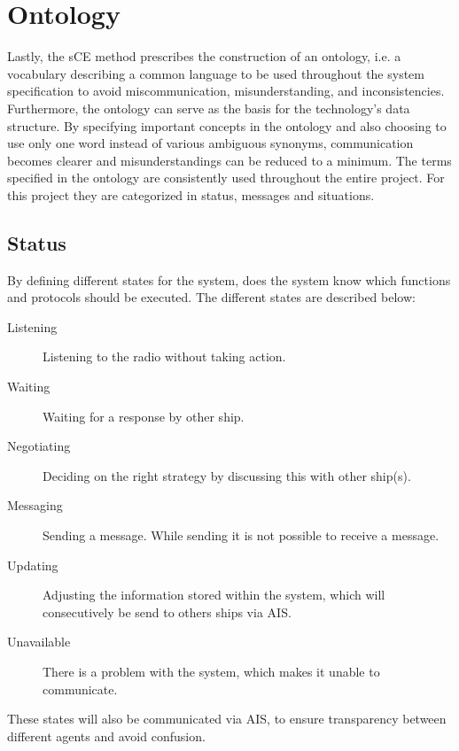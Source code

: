 \section{Ontology}
Lastly, the sCE method prescribes the construction of an ontology, i.e. a vocabulary describing a common language to be used throughout the system specification to avoid miscommunication, misunderstanding, and inconsistencies. Furthermore, the ontology can serve as the basis for the technology’s data structure. By specifying important concepts in the ontology and also choosing to use only one word instead of various ambiguous synonyms, communication becomes clearer and misunderstandings can be reduced to a minimum. The terms specified in the ontology are consistently used throughout the entire project. For this project they are categorized in status, messages and situations.

\subsection{Status}
By defining different states for the system, does the system know which functions and protocols should be executed. The different states are described below:
\begin{description}
	\item [Listening] Listening to the radio without taking action.
	\item [Waiting] Waiting for a response by other ship.
	\item [Negotiating] Deciding on the right strategy by discussing this with other ship(s).
	\item [Messaging] Sending a message. While sending it is not possible to receive a message.
	\item [Updating] Adjusting the information stored within the system, which will consecutively be send to others ships via \ac{AIS}.
	\item [Unavailable] There is a problem with the system, which makes it unable to communicate.
\end{description}
These states will also be communicated via \ac{AIS}, to ensure transparency between different agents and avoid confusion.

